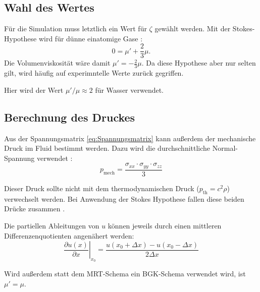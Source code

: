\documentclass[a4paper,10pt]{scrreprt}
\begin{document}
\subsection{Wahl des Wertes}
Für die Simulation muss letztlich ein Wert für $\zeta$ gewählt werden. 
Mit der Stokes-Hypothese wird für dünne einatomige Gase \cite{Graves1999}:
\begin{equation}
 0 = \mu' + \frac{2}{3} \mu.
\end{equation}
Die Volumenviskosität wäre damit $\mu' = - \frac{2}{3} \mu$. Da diese Hypothese aber nur selten gilt, wird häufig auf experimntelle Werte zurück gegriffen.

Hier wird der Wert $\mu' / \mu \approx 2$ für Wasser \cite{Rosenhead1954} verwendet.

\subsection{Berechnung des Druckes}
Aus der Spannungsmatrix \eqref{eq:Spannungsmatrix} kann außerdem der mechanische Druck im Fluid bestimmt werden.
Dazu wird die durchschnittliche Normal-Spannung verwendet \cite{Graves1999}:
\begin{equation}
 p_{\text{mech}} = \frac{\sigma_{xx} \cdot \sigma_{yy} \cdot \sigma_{zz}}{3}
\end{equation}

Dieser Druck sollte nicht mit dem thermodynamischen Druck ($p_{\text{th}}=c^2 \rho$) verwechselt werden. Bei Anwendung der Stokes Hypothese fallen diese beiden Drücke zusammen \cite{Graves1999}.

Die partiellen Ableitungen von $u$ können jeweils durch einen mittleren Differenzenquotienten angenähert werden:
\begin{equation}
 \left. \frac{\partial u(x)}{\partial x}\right|_{x_0} = \frac{u(x_0 + \Delta x) - u(x_0 - \Delta x)}{2 \Delta x}
\end{equation}

Wird außerdem statt dem MRT-Schema ein BGK-Schema verwendet wird, ist $\mu' =  \mu$.






\printbibliography
\end{document}
